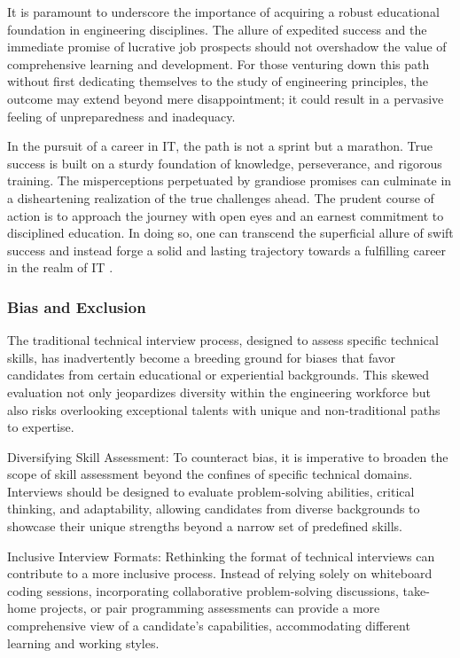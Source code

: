 \documentclass[
    a4paper, %
    10pt, %
    unnumberedsections, %
    twoside, %
]{LTJournalArticle}
\begin{document}
It is paramount to underscore the importance of acquiring a robust educational foundation in engineering disciplines. The allure of expedited success and the immediate promise of lucrative job prospects should not overshadow the value of comprehensive learning and development. For those venturing down this path without first dedicating themselves to the study of engineering principles, the outcome may extend beyond mere disappointment; it could result in a pervasive feeling of unpreparedness and inadequacy.

In the pursuit of a career in IT, the path is not a sprint but a marathon. True success is built on a sturdy foundation of knowledge, perseverance, and rigorous training. The misperceptions perpetuated by grandiose promises can culminate in a disheartening realization of the true challenges ahead. The prudent course of action is to approach the journey with open eyes and an earnest commitment to disciplined education. In doing so, one can transcend the superficial allure of swift success and instead forge a solid and lasting trajectory towards a fulfilling career in the realm of IT \cite{tetlock2007illusion}.











\subsubsection*{Bias and Exclusion}

The traditional technical interview process, designed to assess specific technical skills, has inadvertently become a breeding ground for biases that favor candidates from certain educational or experiential backgrounds. This skewed evaluation not only jeopardizes diversity within the engineering workforce but also risks overlooking exceptional talents with unique and non-traditional paths to expertise.

Diversifying Skill Assessment:
To counteract bias, it is imperative to broaden the scope of skill assessment beyond the confines of specific technical domains. Interviews should be designed to evaluate problem-solving abilities, critical thinking, and adaptability, allowing candidates from diverse backgrounds to showcase their unique strengths beyond a narrow set of predefined skills.

Inclusive Interview Formats:
Rethinking the format of technical interviews can contribute to a more inclusive process. Instead of relying solely on whiteboard coding sessions, incorporating collaborative problem-solving discussions, take-home projects, or pair programming assessments can provide a more comprehensive view of a candidate's capabilities, accommodating different learning and working styles.
\end{document}

